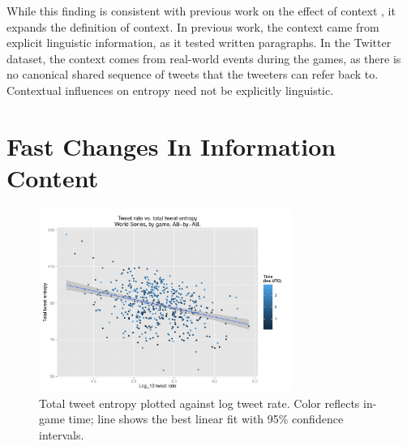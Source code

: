 \documentclass[11pt,letterpaper]{article}
\begin{document}
While this finding is consistent with previous work on the effect of context \cite{genzel2002,qian2012}, it expands the definition of context.  In previous work, the context came from explicit linguistic information, as it tested written paragraphs.  In the Twitter dataset, the context comes from real-world events during the games, as there is no canonical shared sequence of tweets that the tweeters can refer back to.  Contextual influences on entropy need not be explicitly linguistic.

\section{Fast Changes In Information Content}

\begin{figure}
 \centering
  \includegraphics[width=3.25in]{figures/rate-total-ent-agg}
 \caption{Total tweet entropy plotted against log tweet rate. Color reflects in-game time; line shows the best linear fit with 95\% confidence intervals.}\label{fig:time-perword-ent}\vspace*{-.5em}
\end{figure}
\end{document}
